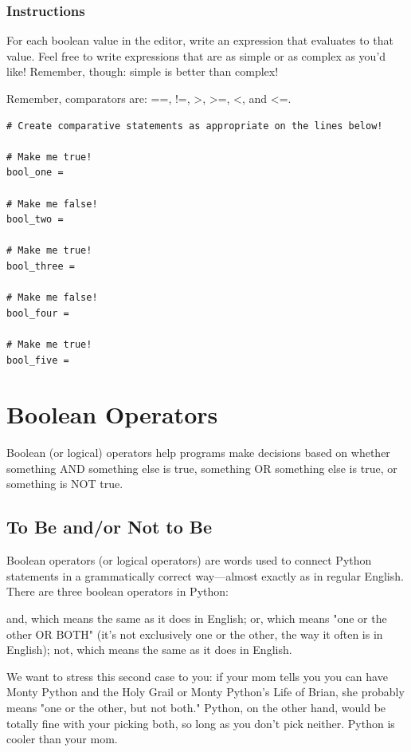 \documentclass[12pt,a4paper,final,twoside,onecolumn,titlepage]{book}
\begin{document}
\subsubsection{Instructions}

For each boolean value in the editor, write an expression that evaluates to that value. Feel free to write expressions that are as simple or as complex as you'd like! Remember, though: simple is better than complex!

Remember, comparators are: ==, !=, >, >=, <, and <=.

\begin{lstlisting}
# Create comparative statements as appropriate on the lines below!

# Make me true!
bool_one = 

# Make me false!
bool_two = 

# Make me true!
bool_three = 

# Make me false!
bool_four = 

# Make me true!
bool_five = 
\end{lstlisting}

\section{Boolean Operators}
Boolean (or logical) operators help programs make decisions based on whether something AND something else is true, something OR something else is true, or something is NOT true.

\subsection{To Be and/or Not to Be}

Boolean operators (or logical operators) are words used to connect Python statements in a grammatically correct way—almost exactly as in regular English. There are three boolean operators in Python:

    and, which means the same as it does in English;
    or, which means "one or the other OR BOTH" (it's not exclusively one or the other, the way it often is in English);
    not, which means the same as it does in English.

We want to stress this second case to you: if your mom tells you you can have Monty Python and the Holy Grail or Monty Python's Life of Brian, she probably means "one or the other, but not both." Python, on the other hand, would be totally fine with your picking both, so long as you don't pick neither. Python is cooler than your mom.
\end{document}
